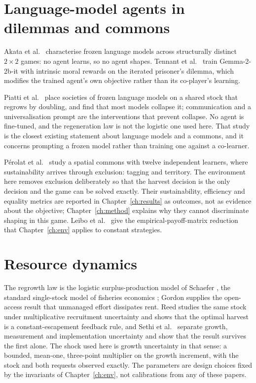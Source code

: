 \section{Language-model agents in dilemmas and commons}
\label{sec:lit-llm}

Akata et al.\ \cite{akata2025} characterise frozen language models across
structurally distinct \(2\times2\) games: no agent learns, so no agent
shapes.
Tennant et al.\ \cite{tennant2025} train Gemma-2-2b-it with intrinsic moral
rewards on the iterated prisoner's dilemma, which modifies the trained
agent's own objective rather than its co-player's learning.

Piatti et al.\ \cite{piatti2024} place societies of frozen language models
on a shared stock that regrows by doubling, and find that most models
collapse it; communication and a universalisation prompt are the
interventions that prevent collapse.
No agent is fine-tuned, and the regeneration law is not the logistic one
used here.
That study is the closest existing statement about language models and a
commons, and it concerns prompting a frozen model rather than training one
against a co-learner.

P\'erolat et al.\ \cite{perolat2017} study a spatial commons with twelve
independent learners, where sustainability arrives through exclusion:
tagging and territory.
The environment here removes exclusion deliberately so that the harvest
decision is the only decision and the game can be solved exactly.
Their sustainability, efficiency and equality metrics are reported in
Chapter~\ref{ch:results} as outcomes, not as evidence about the objective;
Chapter~\ref{ch:method} explains why they cannot discriminate shaping in
this game.
Leibo et al.\ \cite{leibo2017} give the empirical-payoff-matrix reduction
that Chapter~\ref{ch:env} applies to constant strategies.

\section{Resource dynamics}
\label{sec:lit-cpr}

The regrowth law is the logistic surplus-production model of Schaefer
\cite{schaefer1954}, the standard single-stock model of fisheries economics
\cite{clark1990}; Gordon \cite{gordon1954} supplies the open-access result
that unmanaged effort dissipates rent.
Reed \cite{reed1979} studies the same stock under multiplicative
recruitment uncertainty and shows that the optimal harvest is a
constant-escapement feedback rule, and Sethi et al.\ \cite{sethi2005}
separate growth, measurement and implementation uncertainty and show that
the result survives the first alone.
The shock used here is growth uncertainty in that sense: a bounded,
mean-one, three-point multiplier on the growth increment, with the stock and
both requests observed exactly.
The parameters are design choices fixed by the invariants of
Chapter~\ref{ch:env}, not calibrations from any of these papers.

